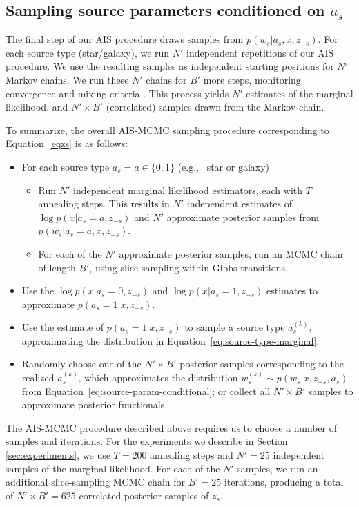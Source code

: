 \subsection{Sampling source parameters conditioned on $a_s$}
\label{mcmc2}
The final step of our AIS procedure draws samples from $p(w_s | a_s, x, z_{-s})$.
For each source type (star/galaxy), we run $N'$ independent repetitions of our AIS procedure.
We use the resulting samples as independent starting positions for $N'$ Markov chains.
We run these $N'$ chains for $B'$ more steps, monitoring convergence and mixing criteria \citep{gelman1992inference}.
This process yields $N'$ estimates of the marginal likelihood, and $N' \times B'$ (correlated) samples drawn from the Markov chain.

To summarize, the overall AIS-MCMC sampling procedure corresponding to Equation~\ref{eqzs} is as follows:
\begin{itemize}
\item For each source type $a_s = a \in \{0, 1\}$ (e.g., ~star or galaxy)
\begin{itemize}
  \item Run $N'$ independent marginal likelihood estimators, each with $T$ annealing steps. This results in $N'$ independent estimates of $\log p(x | a_s=a, z_{-s})$ and $N'$ approximate posterior samples from $p(w_s | a_s = a, x, z_{-s})$.
  \item For each of the $N'$ approximate posterior samples, run an MCMC chain of length $B'$, using slice-sampling-within-Gibbs transitions.
\end{itemize}
\item Use the $\log p(x | a_s = 0, z_{-s})$ and $\log p(x | a_s=1, z_{-s})$ estimates to approximate $p(a_s = 1 | x, z_{-s})$.
\item Use the estimate of $p(a_s = 1 | x, z_{-s})$ to sample a source type $a_s^{(k)}$, approximating the distribution in Equation~\ref{eq:source-type-marginal}.
\item Randomly choose one of the $N' \times B'$ posterior samples corresponding to the realized $a_s^{(k)}$, which approximates the distribution $w_s^{(k)} \sim p(w_s | x, z_{-s}, a_s)$ from Equation~\ref{eq:source-param-conditional}; or collect all $N' \times B'$ samples to approximate posterior functionals.
\end{itemize}

The AIS-MCMC procedure described above requires us to choose a number of samples and iterations.  For the experiments we describe in Section \ref{sec:experiments}, we use $T = 200$ annealing steps and $N'=25$ independent samples of the marginal likelihood.  For each of the $N'$ samples, we run an additional slice-sampling MCMC chain for $B'=25$ iterations, producing a total of $N'\times B' = 625$ correlated posterior samples of $z_s$.

